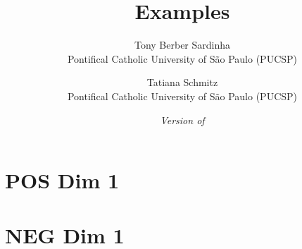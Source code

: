 \documentclass[letterpaper,10pt]{article}
\title{Examples}
\author{
  Tony Berber Sardinha \\ Pontifical Catholic University of São Paulo (PUCSP) \and
  Tatiana Schmitz \\ Pontifical Catholic University of São Paulo (PUCSP)
}
\date{\small\textit{Version of \DTMnow}}
\begin{document}
\maketitle

\tableofcontents

\section{POS Dim 1}









































\section{NEG Dim 1}









































\end{document}
